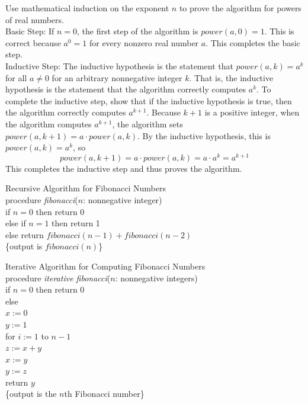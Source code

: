 \documentclass[12pt]{article}
\begin{document}
\begin{example} Use mathematical induction on the exponent $n$ to prove the algorithm for powers of real numbers. \\ 
Basic Step: If $n = 0$, the first step of the algorithm is $power(a, 0) = 1$. This is correct because $a^0 = 1$ for every nonzero real number $a$. This completes the basic step. \\ 
Inductive Step: The inductive hypothesis is the statement that $power(a, k) = a^k$ for all $a \neq 0$ for an arbitrary nonnegative integer $k$. That is, the inductive hypothesis is the statement that the algorithm correctly computes $a^k$. To complete the inductive step, show that if the inductive hypothesis is true, then the algorithm correctly computes $a^{k + 1}$. Because $k + 1$ is a positive integer, when the algorithm computes $a^{k + 1}$, the algorithm sets $power(a, k + 1) = a \cdot power(a, k)$. By the inductive hypothesis, this is $power(a, k) = a^k$, so $$power(a, k + 1) = a \cdot power(a, k) = a \cdot a^k = a^{k + 1} $$ This completes the inductive step and thus proves the algorithm. \end{example} 
\begin{alg} Recursive Algorithm for Fibonacci Numbers \\ 
procedure \textit{fibonacci}($n$: nonnegative integer) \\ 
if $n = 0$ then return 0 \\ 
else if $n = 1$ then return 1 \\
else return $fibonacci(n - 1) + fibonacci(n - 2)$ \\ \{output is $fibonacci(n)$\} \end{alg} 
\begin{alg} Iterative Algorithm for Computing Fibonacci Numbers \\ 
procedure \textit{iterative fibonacci}($n$: nonnegative integers) \\ 
if $n = 0$ then return 0 \\ 
else \\ 
\indent $x := 0$ \\ \indent $y:= 1$ \\ \indent for $i := 1$ to $n - 1$ \\
\indent \indent $z:= x + y$ \\ 
\indent \indent $x:= y $ \\
\indent \indent $y:= z $ \\ 
\indent return $y$ \\ \{output is the $n$th Fibonacci number\} \end{alg} 
\end{document}
